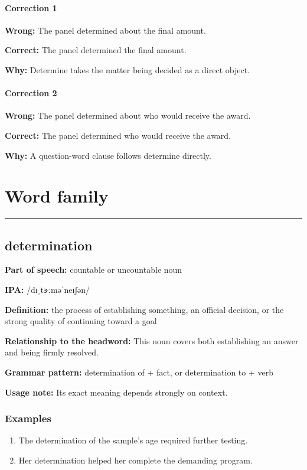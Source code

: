 \documentclass[11pt]{article}
\newcommand{\sectionrule}{\par\vspace{-0.5em}\noindent\textcolor{Accent}{\rule{\linewidth}{0.6pt}}\par}
\begin{document}
\paragraph{Correction 1}
\textbf{Wrong:} The panel determined about the final amount.

\textbf{Correct:} The panel determined the final amount.

\textbf{Why:} Determine takes the matter being decided as a direct object.

\paragraph{Correction 2}
\textbf{Wrong:} The panel determined about who would receive the award.

\textbf{Correct:} The panel determined who would receive the award.

\textbf{Why:} A question-word clause follows determine directly.

\section{Word family}
\sectionrule
\subsection{determination}
\textbf{Part of speech:} countable or uncountable noun

\textbf{IPA:} /dɪˌtɝːməˈneɪʃən/

\textbf{Definition:} the process of establishing something, an official decision, or the strong quality of continuing toward a goal

\textbf{Relationship to the headword:} This noun covers both establishing an answer and being firmly resolved.

\textbf{Grammar pattern:} determination of + fact, or determination to + verb

\textbf{Usage note:} Its exact meaning depends strongly on context.

\subsubsection{Examples}
\begin{enumerate}
  \item The determination of the sample's age required further testing.
  \item Her determination helped her complete the demanding program.
\end{enumerate}
\end{document}

